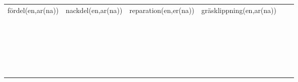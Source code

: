 \begin{center}
\begin{adjustwidth}{-2.5cm}{}
\begin{tabular}{|c c c c c c|}
            fördel(en,ar(na)) & nackdel(en,ar(na)) & reparation(en,er(na)) & gräsklippning(en,ar(na)) &  &  \\
             &  &  &  &  &  \\
             &  &  &  &  &  \\
             &  &  &  &  &  \\
             &  &  &  &  &  \\
             &  &  &  &  &  \\
             &  &  &  &  &  \\
             &  &  &  &  &  \\
             &  &  &  &  &  \\
             &  &  &  &  &  \\
             &  &  &  &  &  \\
             &  &  &  &  &  \\
             &  &  &  &  &  \\
             &  &  &  &  &  \\
             &  &  &  &  &  \\
             &  &  &  &  &  \\
             &  &  &  &  &  \\
             &  &  &  &  &  \\
             &  &  &  &  &  \\
             &  &  &  &  &  \\
             &  &  &  &  &  \\
             &  &  &  &  &  \\
             &  &  &  &  &  \\
             &  &  &  &  &  \\
            \hline
        \end{tabular}
    \end{adjustwidth}
\end{center}

